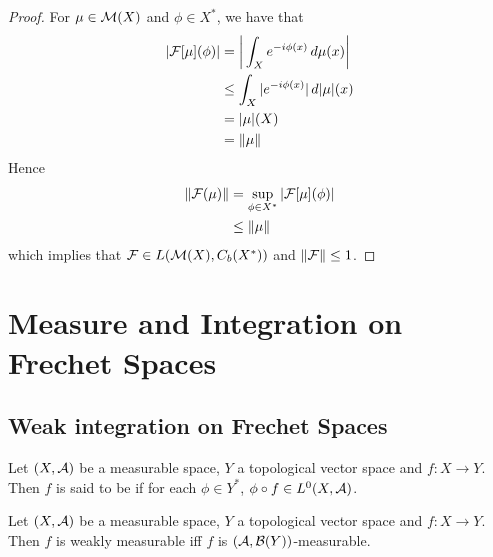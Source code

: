 \documentclass{book}
\begin{document}
	\begin{proof}
		For $\mu \in \mathcal{M}(X)$ and $\phi \in X^*$, we have that 
		\begin{align*}
			|\mathcal{F}[\mu](\phi)|
			& =  \bigg| \int_X e^{-i \phi(x)} \, d \mu(x) \bigg| \\
			& \leq \int_X |e^{-i \phi(x)}| \, d|\mu|(x) \\
			& = |\mu|(X) \\
			& = \|\mu\|
		\end{align*}
		Hence 
		\begin{align*}
			\|\mathcal{F}(\mu)\| 
			& = \sup_{\phi \in X^*} |\mathcal{F}[\mu](\phi)| \\
			& \leq \|\mu\|
		\end{align*}
		which implies that $\mathcal{F} \in L(\mathcal{M}(X), C_b(X^*))$ and $\|\mathcal{F}\| \leq 1$.
	\end{proof}






































	\newpage
\chapter{Measure and Integration on Frechet Spaces}

\section{Weak integration on Frechet Spaces}

\begin{defn}
	Let $(X, \mathcal{A})$ be a measurable space, $Y$ a topological vector space and $f:X \rightarrow Y$. Then $f$ is said to be  if for each $\phi \in Y^*$, $\phi \circ f \in L^0(X, \mathcal{A})$. 
\end{defn}

\begin{ex}
	Let $(X, \mathcal{A})$ be a measurable space, $Y$ a topological vector space and $f:X \rightarrow Y$. Then $f$ is weakly measurable iff $f$ is $(\mathcal{A}, \mathcal{B}(Y))$-measurable.
\end{ex}
\end{document}
